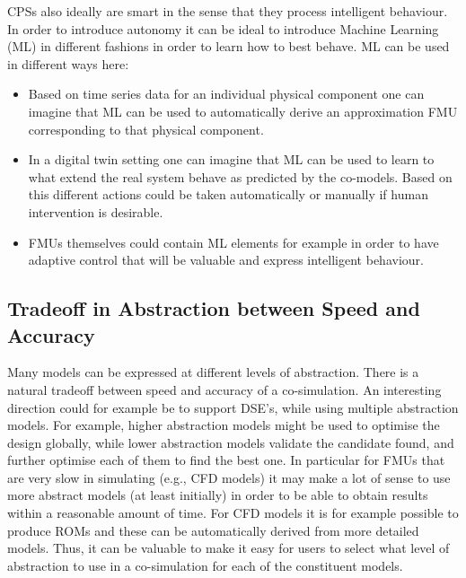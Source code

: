 CPSs also ideally are smart in the sense that they process intelligent behaviour. In order to introduce autonomy it can be ideal to introduce Machine Learning (ML) in different fashions in order to learn how to best behave. ML can be used in different ways here:

\begin{itemize}
\item Based on time series data for an individual physical component one can imagine that ML can be used to automatically derive an approximation FMU corresponding to that physical component.
\item In a digital twin setting one can imagine that ML can be used to learn to what extend the real system behave as predicted by the co-models. Based on this different actions could be taken automatically or manually if human intervention is desirable.
\item FMUs themselves could contain ML elements for example in order to have adaptive control that will be valuable and express intelligent behaviour.
\end{itemize}


\subsection{Tradeoff in Abstraction between Speed and Accuracy}

Many models can be expressed at different levels of abstraction. There is a natural tradeoff between speed and accuracy of a co-simulation. 
An interesting direction could for example be to support DSE's, while using multiple abstraction models.
For example, higher abstraction models might be used to optimise the design globally, while lower abstraction models validate the candidate found, and further optimise each of them to find the best one. In particular for FMUs that are very slow in simulating (e.g., CFD models) it may make a lot of sense to use more abstract models (at least initially) in order to be able to obtain results within a reasonable amount of time. For CFD models it is for example possible to produce ROMs and these can be automatically derived from more detailed models. Thus, it can be valuable to make it easy for users to select what level of abstraction to use in a co-simulation for each of the constituent models.

